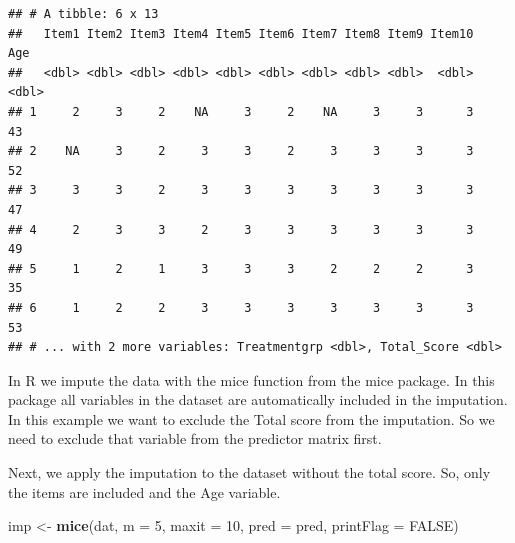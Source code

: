 \documentclass[
]{book}
\newenvironment{Shaded}{\begin{snugshade}}{\end{snugshade}}
\newcommand{\CommentTok}[1]{\textcolor[rgb]{0.56,0.35,0.01}{\textit{#1}}}
\newcommand{\DataTypeTok}[1]{\textcolor[rgb]{0.13,0.29,0.53}{#1}}
\newcommand{\DecValTok}[1]{\textcolor[rgb]{0.00,0.00,0.81}{#1}}
\newcommand{\KeywordTok}[1]{\textcolor[rgb]{0.13,0.29,0.53}{\textbf{#1}}}
\newcommand{\NormalTok}[1]{#1}
\newcommand{\OperatorTok}[1]{\textcolor[rgb]{0.81,0.36,0.00}{\textbf{#1}}}
\newcommand{\OtherTok}[1]{\textcolor[rgb]{0.56,0.35,0.01}{#1}}
\newcommand{\StringTok}[1]{\textcolor[rgb]{0.31,0.60,0.02}{#1}}
\begin{document}
\begin{verbatim}
## # A tibble: 6 x 13
##   Item1 Item2 Item3 Item4 Item5 Item6 Item7 Item8 Item9 Item10   Age
##   <dbl> <dbl> <dbl> <dbl> <dbl> <dbl> <dbl> <dbl> <dbl>  <dbl> <dbl>
## 1     2     3     2    NA     3     2    NA     3     3      3    43
## 2    NA     3     2     3     3     2     3     3     3      3    52
## 3     3     3     2     3     3     3     3     3     3      3    47
## 4     2     3     3     2     3     3     3     3     3      3    49
## 5     1     2     1     3     3     3     2     2     2      3    35
## 6     1     2     2     3     3     3     3     3     3      3    53
## # ... with 2 more variables: Treatmentgrp <dbl>, Total_Score <dbl>
\end{verbatim}

In R we impute the data with the mice function from the mice package. In this package all variables in the dataset are automatically included in the imputation. In this example we want to exclude the Total score from the imputation. So we need to exclude that variable from the predictor matrix first.

\begin{Shaded}
\end{Shaded}

Next, we apply the imputation to the dataset without the total score. So, only the items are included and the Age variable.

\begin{Shaded}
\begin{Highlighting}[]
\NormalTok{imp <-}\StringTok{ }\KeywordTok{mice}\NormalTok{(dat, }\DataTypeTok{m =} \DecValTok{5}\NormalTok{, }\DataTypeTok{maxit =} \DecValTok{10}\NormalTok{, }\DataTypeTok{pred =}\NormalTok{ pred, }\DataTypeTok{printFlag =} \OtherTok{FALSE}\NormalTok{)}
\end{Highlighting}
\end{Shaded}
\end{document}
